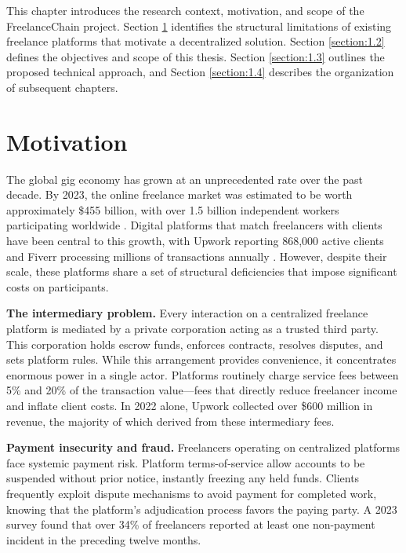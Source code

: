 This chapter introduces the research context, motivation, and scope of the FreelanceChain project. Section \ref{section:1.1} identifies the structural limitations of existing freelance platforms that motivate a decentralized solution. Section \ref{section:1.2} defines the objectives and scope of this thesis. Section \ref{section:1.3} outlines the proposed technical approach, and Section \ref{section:1.4} describes the organization of subsequent chapters.

\section{Motivation}
\label{section:1.1}

The global gig economy has grown at an unprecedented rate over the past decade. By 2023, the online freelance market was estimated to be worth approximately \$455 billion, with over 1.5 billion independent workers participating worldwide \cite{statista2024freelance}. Digital platforms that match freelancers with clients have been central to this growth, with Upwork reporting 868,000 active clients and Fiverr processing millions of transactions annually \cite{upwork2023, fiverr2023}. However, despite their scale, these platforms share a set of structural deficiencies that impose significant costs on participants.

\textbf{The intermediary problem.} Every interaction on a centralized freelance platform is mediated by a private corporation acting as a trusted third party. This corporation holds escrow funds, enforces contracts, resolves disputes, and sets platform rules. While this arrangement provides convenience, it concentrates enormous power in a single actor. Platforms routinely charge service fees between 5\% and 20\% of the transaction value---fees that directly reduce freelancer income and inflate client costs. In 2022 alone, Upwork collected over \$600 million in revenue, the majority of which derived from these intermediary fees.

\textbf{Payment insecurity and fraud.} Freelancers operating on centralized platforms face systemic payment risk. Platform terms-of-service allow accounts to be suspended without prior notice, instantly freezing any held funds. Clients frequently exploit dispute mechanisms to avoid payment for completed work, knowing that the platform's adjudication process favors the paying party. A 2023 survey found that over 34\% of freelancers reported at least one non-payment incident in the preceding twelve months.


